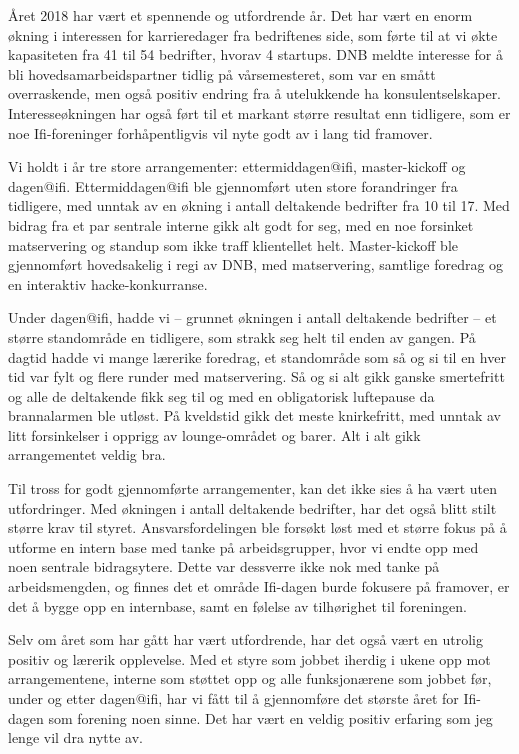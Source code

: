 \documentclass[10pt,norsk,a4paper]{article}
\begin{document}
\begin{multicols}{2}
Året 2018 har vært et spennende og utfordrende år. Det har vært en enorm
økning i interessen for karrieredager fra bedriftenes side, som førte til at
vi økte kapasiteten fra 41 til 54 bedrifter, hvorav 4 startups. DNB meldte
interesse for å bli hovedsamarbeidspartner tidlig på vårsemesteret, som var en
smått overraskende, men også positiv endring fra å utelukkende ha
konsulentselskaper. Interesseøkningen har også ført til et markant større
resultat enn tidligere, som er noe Ifi-foreninger forhåpentligvis vil nyte
godt av i lang tid framover.

Vi holdt i år tre store arrangementer: ettermiddagen@ifi, master-kickoff og 
dagen@ifi. Ettermiddagen@ifi ble gjennomført uten store forandringer fra
tidligere, med unntak av en økning i antall deltakende bedrifter fra 10 til 17.
Med bidrag fra et par sentrale interne gikk alt godt for seg, med en noe
forsinket matservering og standup som ikke traff klientellet helt.
Master-kickoff ble gjennomført hovedsakelig i regi av DNB, med matservering,
samtlige foredrag og en interaktiv hacke-konkurranse.

Under dagen@ifi, hadde vi -- grunnet økningen i antall deltakende bedrifter --
et større standområde en tidligere, som strakk seg helt til enden av gangen.
På dagtid hadde vi mange lærerike foredrag, et standområde som så og si til en
hver tid var fylt og flere runder med matservering. Så og si alt gikk ganske
smertefritt og alle de deltakende fikk seg til og med en obligatorisk
luftepause da brannalarmen ble utløst. På kveldstid gikk det meste knirkefritt,
med unntak av litt forsinkelser i opprigg av lounge-området og barer. Alt i alt
gikk arrangementet veldig bra.

Til tross for godt gjennomførte arrangementer, kan det ikke sies å ha vært
uten utfordringer. Med økningen i antall deltakende bedrifter, har det også
blitt stilt større krav til styret. Ansvarsfordelingen ble forsøkt løst med et
større fokus på å utforme en intern base med tanke på arbeidsgrupper, hvor vi
endte opp med noen sentrale bidragsytere. Dette var dessverre ikke nok med
tanke på arbeidsmengden, og finnes det et område Ifi-dagen burde fokusere på
framover, er det å bygge opp en internbase, samt en følelse av tilhørighet til
foreningen.

Selv om året som har gått har vært utfordrende, har det også vært en utrolig
positiv og lærerik opplevelse. Med et styre som jobbet iherdig i ukene opp mot
arrangementene, interne som støttet opp og alle funksjonærene som jobbet før,
under og etter dagen@ifi, har vi fått til å gjennomføre det største året for
Ifi-dagen som forening noen sinne. Det har vært en veldig positiv erfaring som
jeg lenge vil dra nytte av.
\end{multicols}
\end{document}
